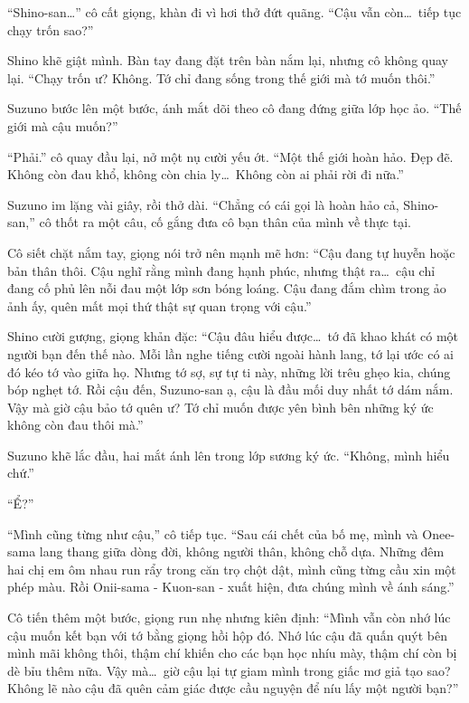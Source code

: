 \documentclass[../main.tex]{subfiles}
\begin{document}
``Shino-san\dots'' cô cất giọng, khàn đi vì hơi thở đứt quãng. ``Cậu vẫn còn\dots\ tiếp tục chạy trốn sao?''

Shino khẽ giật mình. Bàn tay đang đặt trên bàn nắm lại, nhưng cô không quay lại. ``Chạy trốn ư? Không. Tớ chỉ đang sống trong thế giới mà tớ muốn thôi.''

Suzuno bước lên một bước, ánh mắt dõi theo cô đang đứng giữa lớp học ảo. ``Thế giới mà cậu muốn?''

``Phải.'' cô quay đầu lại, nở một nụ cười yếu ớt. ``Một thế giới hoàn hảo. Đẹp đẽ. Không còn đau khổ, không còn chia ly\dots\ Không còn ai phải rời đi nữa.''

Suzuno im lặng vài giây, rồi thở dài. ``Chẳng có cái gọi là hoàn hảo cả, Shino-san,'' cô thốt ra một câu, cố gắng đưa cô bạn thân của mình về thực tại.

Cô siết chặt nắm tay, giọng nói trở nên mạnh mẽ hơn: ``Cậu đang tự huyễn hoặc bản thân thôi. Cậu nghĩ rằng mình đang hạnh phúc, nhưng thật ra\dots\ cậu chỉ đang cố phủ lên nỗi đau một lớp sơn bóng loáng. Cậu đang đắm chìm trong ảo ảnh ấy, quên mất mọi thứ thật sự quan trọng với cậu.''

Shino cười gượng, giọng khản đặc: ``Cậu đâu hiểu được\dots\ tớ đã khao khát có một người bạn đến thế nào. Mỗi lần nghe tiếng cười ngoài hành lang, tớ lại ước có ai đó kéo tớ vào giữa họ. Nhưng tớ sợ, sự tự ti này, những lời trêu ghẹo kia, chúng bóp nghẹt tớ. Rồi cậu đến, Suzuno-san ạ, cậu là đầu mối duy nhất tớ dám nắm. Vậy mà giờ cậu bảo tớ quên ư? Tớ chỉ muốn được yên bình bên những ký ức không còn đau thôi mà.''

Suzuno khẽ lắc đầu, hai mắt ánh lên trong lớp sương ký ức. ``Không, mình hiểu chứ.''

``Ể?''

``Mình cũng từng như cậu,'' cô tiếp tục. ``Sau cái chết của bố mẹ, mình và Onee-sama lang thang giữa dòng đời, không người thân, không chỗ dựa. Những đêm hai chị em ôm nhau run rẩy trong căn trọ chột dật, mình cũng từng cầu xin một phép màu. Rồi Onii-sama - Kuon-san - xuất hiện, đưa chúng mình về ánh sáng.''

Cô tiến thêm một bước, giọng run nhẹ nhưng kiên định: ``Mình vẫn còn nhớ lúc cậu muốn kết bạn với tớ bằng giọng hồi hộp đó. Nhớ lúc cậu đã quấn quýt bên mình mãi không thôi, thậm chí khiến cho các bạn học nhíu mày, thậm chí còn bị dè bỉu thêm nữa. Vậy mà\dots\ giờ cậu lại tự giam mình trong giấc mơ giả tạo sao? Không lẽ nào cậu đã quên cảm giác được cầu nguyện để níu lấy một người bạn?''
\end{document}

